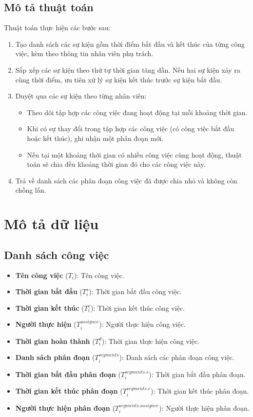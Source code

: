 \documentclass{article}
\begin{document}
\subsection{Mô tả thuật toán}
Thuật toán thực hiện các bước sau:
\begin{enumerate} 
    \item Tạo danh sách các sự kiện gồm thời điểm bắt đầu và kết thúc của từng công việc, kèm theo thông tin nhân viên phụ trách. 
    \item Sắp xếp các sự kiện theo thứ tự thời gian tăng dần. Nếu hai sự kiện xảy ra cùng thời điểm, ưu tiên xử lý sự kiện kết thúc trước sự kiện bắt đầu. 
    \item Duyệt qua các sự kiện theo từng nhân viên: 
    \begin{itemize} \item Theo dõi tập hợp các công việc đang hoạt động tại mỗi khoảng thời gian. 
        \item Khi có sự thay đổi trong tập hợp các công việc (có công việc bắt đầu hoặc kết thúc), ghi nhận một phân đoạn mới. 
        \item Nếu tại một khoảng thời gian có nhiều công việc cùng hoạt động, thuật toán sẽ chia đều khoảng thời gian đó cho các công việc này. 
    \end{itemize}
     \item Trả về danh sách các phân đoạn công việc đã được chia nhỏ và không còn chồng lấn. 
    \end{enumerate}

\section{Mô tả dữ liệu}
\subsection{Danh sách công việc}
\begin{itemize}
    \item \textbf{Tên công việc} ($T_i$): Tên công việc.
    \item \textbf{Thời gian bắt đầu} ($T_i^{s}$): Thời gian bắt đầu công việc.
    \item \textbf{Thời gian kết thúc} ($T_i^{e}$): Thời gian kết thúc công việc.
    \item \textbf{Người thực hiện} ($T_i^{assignee}$): Người thực hiện công việc.
    \item \textbf{Thời gian hoàn thành} ($T_i^{d}$): Thời gian thực hiện công việc.
    \item \textbf{Danh sách phân đoạn} ($T_i^{segments}$): Danh sách các phân đoạn công việc.
    \item \textbf{Thời gian bắt đầu phân đoạn} ($T_i^{segments.s}$): Thời gian bắt đầu phân đoạn.
    \item \textbf{Thời gian kết thúc phân đoạn} ($T_i^{segments.e}$): Thời gian kết thúc phân đoạn.
    \item \textbf{Người thực hiện phân đoạn} ($T_i^{segments.assignee}$): Người thực hiện phân đoạn.
\end{itemize}
\end{document}
